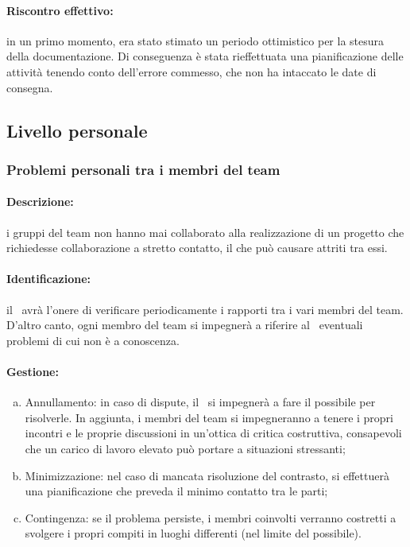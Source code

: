 \documentclass[../PianoProgetto.tex]{subfiles}
\begin{document}
	\paragraph*{Riscontro effettivo:} in un primo momento, era stato stimato un periodo ottimistico per la stesura della documentazione. Di conseguenza è stata rieffettuata una pianificazione delle attività tenendo conto dell’errore commesso, che non ha intaccato le date di consegna.


\subsection{Livello personale}

\subsubsection{Problemi personali tra i membri del team}

	\paragraph*{Descrizione:} i gruppi del team non hanno mai collaborato alla realizzazione di un progetto che richiedesse collaborazione a stretto contatto, il che può causare attriti tra essi.
	
	\paragraph*{Identificazione:} il \responsabilediprogetto\ avrà l’onere di verificare periodicamente i rapporti tra i vari membri del team. D’altro canto, ogni membro del team si impegnerà a riferire al \responsabilediprogetto\ eventuali problemi di cui non è a conoscenza.
	
	\paragraph*{Gestione:}
	\begin{enumerate}[(a)]
		\item Annullamento: in caso di dispute, il \responsabilediprogetto\ si impegnerà a fare il possibile per risolverle. In aggiunta, i membri del team si impegneranno a tenere i propri incontri e le proprie discussioni in un'ottica di critica costruttiva, consapevoli che un carico di lavoro elevato può portare a situazioni stressanti;
		\item Minimizzazione: nel caso di mancata risoluzione del contrasto, si effettuerà una pianificazione che preveda il minimo contatto tra le parti; 
		\item Contingenza: se il problema persiste, i membri coinvolti verranno costretti a svolgere i propri compiti in luoghi differenti (nel limite del possibile).
	\end{enumerate}	
	
\end{document}
